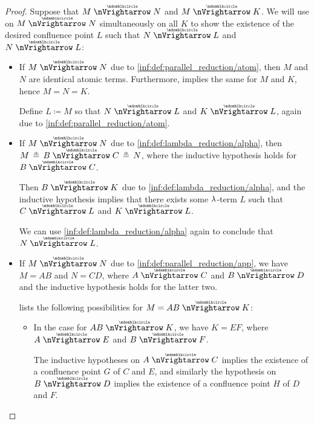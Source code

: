 \begin{proof}
   Suppose that \( M \ppred N \) and \( M \ppred K \). We will use  on \( M \ppred N \) simultaneously on all \( K \) to show the existence of the desired confluence point \( L \) such that \( N \ppred L \) and \( N \ppred L \):
  \begin{itemize}
    \item If \( M \ppred N \) due to \ref{inf:def:parallel_reduction/atom}, then \( M \) and \( N \) are identical atomic terms. Furthermore,  implies the same for \( M \) and \( K \), hence \( M = N = K \).

    Define \( L \coloneqq M \) so that \( N \ppred L \) and \( K \ppred L \), again due to \ref{inf:def:parallel_reduction/atom}.

    \item If \( M \ppred N \) due to \ref{inf:def:lambda_reduction/alpha}, then \( M \aequiv B \ppred C \aequiv N \), where the inductive hypothesis holds for \( B \ppred C \).

    Then \( B \ppred K \) due to \ref{inf:def:lambda_reduction/alpha}, and the inductive hypothesis implies that there exists some \( \mathrm{\lambda} \)-term \( L \) such that \( C \ppred L \) and \( K \ppred L \).

    We can use \ref{inf:def:lambda_reduction/alpha} again to conclude that \( N \ppred L \).

    \item If \( M \ppred N \) due to \ref{inf:def:parallel_reduction/app}, we have \( M = AB \) and \( N = CD \), where \( A \ppred C \) and \( B \ppred D \) and the inductive hypothesis holds for the latter two.

     lists the following possibilities for \( M = AB \ppred K \):
    \begin{itemize}
      \item In the case  for \( AB \ppred K \), we have \( K = EF \), where \( A \ppred E \) and \( B \ppred F \).

      The inductive hypotheses on \( A \ppred C \) implies the existence of a confluence point \( G \) of \( C \) and \( E \), and similarly the hypothesis on \( B \ppred D \) implies the existence of a confluence point \( H \) of \( D \) and \( F \).


\end{itemize}
\end{itemize}
\end{proof}
